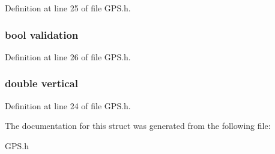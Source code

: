 Definition at line 25 of file G\-P\-S.\-h.

\hypertarget{struct__location_a421230405ce8a68e92b05f37a8eac23c}{
\subsubsection[{validation}]{\setlength{\rightskip}{0pt plus 5cm}bool validation}}\label{struct__location_a421230405ce8a68e92b05f37a8eac23c}


Definition at line 26 of file G\-P\-S.\-h.

\hypertarget{struct__location_af585cb3fb143047cf641307ab9f5a2f0}{
\subsubsection[{vertical}]{\setlength{\rightskip}{0pt plus 5cm}double vertical}}\label{struct__location_af585cb3fb143047cf641307ab9f5a2f0}


Definition at line 24 of file G\-P\-S.\-h.



The documentation for this struct was generated from the following file\-:\begin{DoxyCompactItemize}
\item 
G\-P\-S.\-h\end{DoxyCompactItemize}
